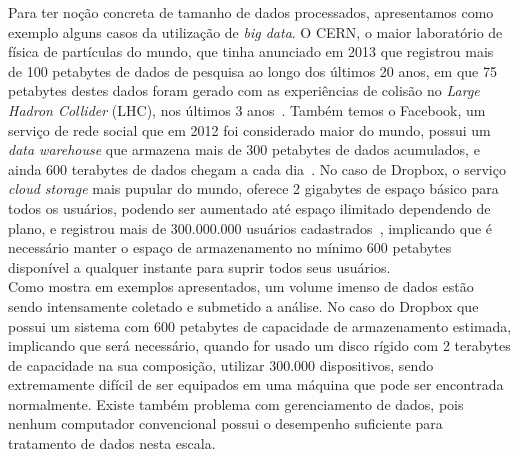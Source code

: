 	Para ter noção concreta de tamanho de dados processados, apresentamos como exemplo alguns casos da utilização de \textit{big data}. O CERN, o maior laboratório de física de partículas do mundo, que tinha anunciado em 2013 que registrou mais de 100 petabytes de dados de pesquisa ao longo dos últimos 20 anos, em que 75 petabytes destes dados foram gerado com as experiências de colisão no \textit{Large Hadron Collider} (LHC), nos últimos 3 anos~\cite{cern}. Também temos o Facebook, um serviço de rede social que em 2012 foi considerado maior do mundo, possui um \textit{data warehouse} que armazena mais de 300 petabytes de dados acumulados, e ainda 600 terabytes de dados chegam a cada dia~\cite{facebook14}. No caso de Dropbox, o serviço \textit{cloud storage} mais pupular do mundo, oferece 2 gigabytes de espaço básico para todos os usuários, podendo ser aumentado até espaço ilimitado dependendo de plano, e registrou mais de 300.000.000 usuários cadastrados~\cite{dropbox}, implicando que é necessário manter o espaço de armazenamento no mínimo 600 petabytes disponível a qualquer instante para suprir todos seus usuários.\\
	
	Como mostra em exemplos apresentados, um volume imenso de dados estão sendo intensamente coletado e submetido a análise. No caso do Dropbox que possui um sistema com 600 petabytes de capacidade de armazenamento estimada, implicando que será necessário, quando for usado um disco rígido com 2 terabytes de capacidade na sua composição, utilizar 300.000 dispositivos, sendo extremamente difícil de ser equipados em uma máquina que pode ser encontrada normalmente. Existe também problema com gerenciamento de dados, pois nenhum computador convencional possui o desempenho suficiente para tratamento de dados nesta escala. \\
	
